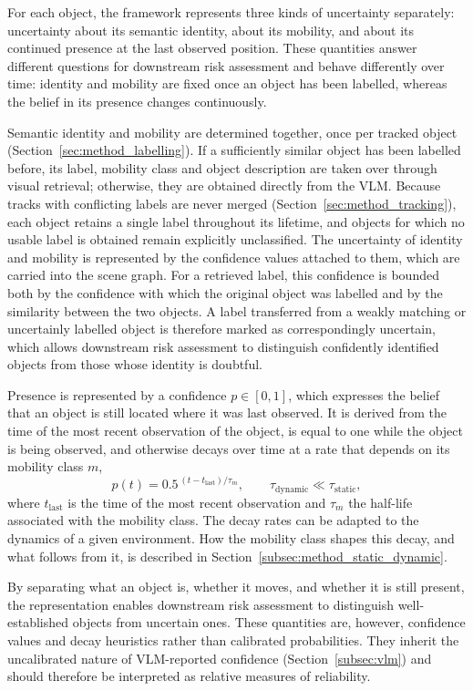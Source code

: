 {\small

For each object, the framework represents three kinds of uncertainty separately: uncertainty about its semantic identity, about its mobility, and about its continued presence at the last observed position. These quantities answer different questions for downstream risk assessment and behave differently over time: identity and mobility are fixed once an object has been labelled, whereas the belief in its presence changes continuously.

Semantic identity and mobility are determined together, once per tracked object (Section~\ref{sec:method_labelling}). If a sufficiently similar object has been labelled before, its label, mobility class and object description are taken over through visual retrieval; otherwise, they are obtained directly from the VLM. Because tracks with conflicting labels are never merged (Section~\ref{sec:method_tracking}), each object retains a single label throughout its lifetime, and objects for which no usable label is obtained remain explicitly unclassified. The uncertainty of identity and mobility is represented by the confidence values attached to them, which are carried into the scene graph. For a retrieved label, this confidence is bounded both by the confidence with which the original object was labelled and by the similarity between the two objects. A label transferred from a weakly matching or uncertainly labelled object is therefore marked as correspondingly uncertain, which allows downstream risk assessment to distinguish confidently identified objects from those whose identity is doubtful.

Presence is represented by a confidence $p \in [0, 1]$, which expresses the belief that an object is still located where it was last observed. It is derived from the time of the most recent observation of the object, is equal to one while the object is being observed, and otherwise decays over time at a rate that depends on its mobility class $m$,
\begin{equation}
p(t) = 0.5^{\,(t - t_{\mathrm{last}})/\tau_m}, \qquad \tau_{\mathrm{dynamic}} \ll \tau_{\mathrm{static}},
\label{eq:presence_decay}
\end{equation}
where $t_{\mathrm{last}}$ is the time of the most recent observation and $\tau_m$ the half-life associated with the mobility class. The decay rates can be adapted to the dynamics of a given environment. How the mobility class shapes this decay, and what follows from it, is described in Section~\ref{subsec:method_static_dynamic}.

By separating what an object is, whether it moves, and whether it is still present, the representation enables downstream risk assessment to distinguish well-established objects from uncertain ones. These quantities are, however, confidence values and decay heuristics rather than calibrated probabilities. They inherit the uncalibrated nature of VLM-reported confidence (Section~\ref{subsec:vlm}) and should therefore be interpreted as relative measures of reliability.

}

